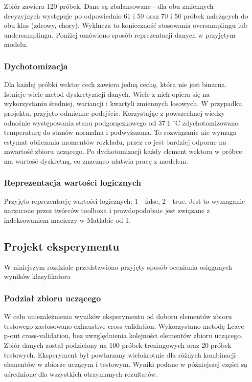 \documentclass[12pt]{article}
\begin{document}
Zbiór zawiera 120 próbek. Dane są zbalansowane - dla obu zmiennych decyzyjnych występuje po odpowiednio 61 i 59 oraz 70 i 50 próbek należących do obu klas (zdrowy, chory). Wyklucza to konieczność stosowania oversamplingu lub undersamplingu. Poniżej omówiono sposób reprezentacji danych w przyjętym modelu.

\subsubsection{Dychotomizacja}
Dla każdej próbki wektor cech zawiera jedną cechę, która nie jest binarna. Istnieje wiele metod dyskretyzacji danych. Wiele z nich opiera się na wykorzystaniu średniej, wariancji i kwartyli zmiennych losowych. W przypadku projektu, przyjęto odmienne podejście. Korzystając z powszechnej wiedzy odnośnie występowania stanu podgorączkowego od 37.1 $^{\circ}$C zdychotomizowano temperaturę do stanów normalna i podwyższona. To rozwiązanie nie wymaga estymat obliczania momentów rozkładu, przez co jest bardziej odporne na zawartość zbioru uczącego. Po dychotomizacji każdy element wektora w próbce ma wartość dyskretną, co znacząco ułatwia pracę z modelem.

\subsubsection{Reprezentacja wartości logicznych}
Przyjęto reprezentację wartości logicznych: 1 - false, 2 - true. Jest to wymaganie narzucone przez twórców toolboxa i prawdopodobnie jest związane z indeksowaniem macierzy w Matlabie od 1. 

\subsection{Projekt eksperymentu}
W niniejszym rozdziale przedstawiono przyjęty sposób oceniania osiąganych wyników klasyfikatora

\subsubsection{Podział zbioru uczącego}

W celu uniezależnienia wyników eksperymentu od doboru elementów zbioru testowego zastosowano exhaustive cross-validation. Wykorzystano metodę Leave-p-out cross-validation, bez uwzględnienia kolejności elementów zbioru uczącego. Zbiór danych został podzielony na 100 próbek treningowych oraz 20 próbek testowych. Eksperyment był powtarzany wielokrotnie dla różnych kombinacji elementów w zbiorze uczącym i testowym. Wyniki podane w późniejszej części są uśrednione dla wszystkich otrzymanych rezultatów.
\end{document}
